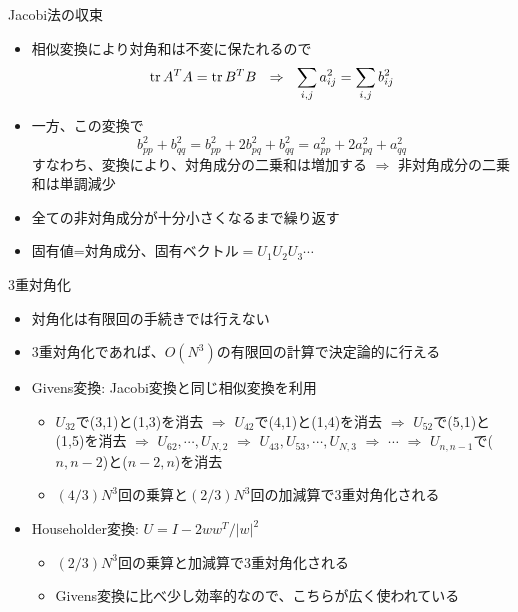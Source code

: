 \documentclass[dvipdfmx]{beamer}
\begin{document}
\begin{frame}[t,fragile]{Jacobi法の収束}
  \begin{itemize}
    \setlength{\itemsep}{1em}
  \item 相似変換により対角和は不変に保たれるので
    \[
      {\rm tr} \, A^T A = {\rm tr} \, B^T B \ \ \Rightarrow \ \
      \sum_{i,j} a_{ij}^2 = \sum_{i,j} b_{ij}^2
    \]
  \item 一方、この変換で
    \[
    b_{pp}^2 + b_{qq}^2 = b_{pp}^2 + 2 b_{pq}^2 + b_{qq}^2 = a_{pp}^2 + 2 a_{pq}^2 + a_{qq}^2
    \]
    すなわち、変換により、対角成分の二乗和は増加する $\Rightarrow$ 非対角成分の二乗和は単調減少
  \item 全ての非対角成分が十分小さくなるまで繰り返す
  \item 固有値=対角成分、固有ベクトル$=U_1 U_2 U_3 \cdots$
  \end{itemize}
\end{frame}

\begin{frame}[t,fragile]{3重対角化}
  \begin{itemize}
  \item 対角化は有限回の手続きでは行えない
  \item 3重対角化であれば、$O(N^3)$の有限回の計算で決定論的に行える
  \item Givens変換: Jacobi変換と同じ相似変換を利用
    \begin{itemize}
    \item $U_{32}$で(3,1)と(1,3)を消去 $\Rightarrow$ $U_{42}$で(4,1)と(1,4)を消去 $\Rightarrow$ $U_{52}$で(5,1)と(1,5)を消去 $\Rightarrow$ $U_{62},\cdots,U_{N,2}$ $\Rightarrow$ $U_{43},U_{53},\cdots,U_{N,3}$ $\Rightarrow$ $\cdots$ $\Rightarrow$ $U_{n,n-1}$で($n,n-2$)と($n-2,n$)を消去
    \item $(4/3)N^3$回の乗算と$(2/3)N^3$回の加減算で3重対角化される
    \end{itemize}
  \item Householder変換: $U = I - 2 w w^T / |w|^2$
    \begin{itemize}
    \item $(2/3)N^3$回の乗算と加減算で3重対角化される
    \item Givens変換に比べ少し効率的なので、こちらが広く使われている
    \end{itemize}
  \end{itemize}
\end{frame}
\end{document}
